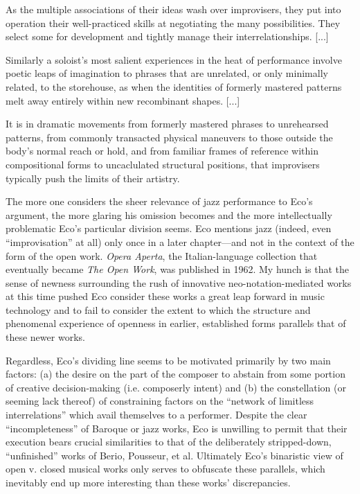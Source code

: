         \begin{smallquote}
            As the multiple associations of their ideas wash over improvisers, they put into operation their well-practiced skills at negotiating the many possibilities. They select some for development and tightly manage their interrelationships. [...]

                \vspace{5pt}

            \noindent Similarly a soloist's most salient experiences in the heat of performance involve poetic leaps of imagination to phrases that are unrelated, or only minimally related, to the storehouse, as when the identities of formerly mastered patterns melt away entirely within new recombinant shapes. [...]

                \vspace{5pt}
            
            \noindent It is in dramatic movements from formerly mastered phrases to unrehearsed patterns, from commonly transacted physical maneuvers to those outside the body's normal reach or hold, and from familiar frames of reference within compositional forms to uncaclulated structural positions, that improvisers typically push the limits of their artistry.\autocite[216-7]{Berliner_1994}
        \end{smallquote}

    The more one considers the sheer relevance of jazz performance to Eco's argument, the more glaring his omission becomes and the more intellectually problematic Eco's particular division seems. Eco mentions jazz (indeed, even ``improvisation'' at all) only once in a later chapter---and not in the context of the form of the open work.\autocite[109]{Eco_Robey_1989} \textit{Opera Aperta}, the Italian-language collection that eventually became \textit{The Open Work}, was published in 1962. My hunch is that the sense of newness surrounding the rush of innovative neo-notation-mediated works at this time pushed Eco consider these works a great leap forward in music technology and to fail to consider the extent to which the structure and phenomenal experience of openness in earlier, established forms parallels that of these newer works. 
    
    Regardless, Eco's dividing line seems to be motivated primarily by two main factors: (a) the desire on the part of the composer to abstain from some portion of creative decision-making (i.e. composerly intent) and (b) the constellation (or seeming lack thereof) of constraining factors on the ``network of limitless interrelations'' which avail themselves to a performer. Despite the clear ``incompleteness'' of Baroque or jazz works, Eco is unwilling to permit that their execution bears crucial similarities to that of the deliberately stripped-down, ``unfinished'' works of Berio, Pousseur, et al. Ultimately Eco's binaristic view of open v. closed musical works only serves to obfuscate these parallels, which inevitably end up more interesting than these works' discrepancies.
    
